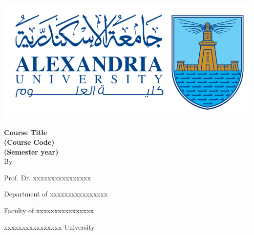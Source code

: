 \newpage
\thispagestyle{empty}
\vspace*{\fill}
\newpage
\thispagestyle{empty}
\setcounter{page}{0}
\begingroup
{}
\begin{center}
    \includegraphics[scale=.5]{collage logo.png}
    \vspace*{1.5cm}
    \par
    {\fontsize{20pt}{30pt}\selectfont
        \textbf{Course Title\\(Course Code)\\(Semester year)}
        \\
        \vspace*{.75cm}
        By
        \vspace*{.75cm}

        Prof. Dr. xxxxxxxxxxxxxxxx

        Department of xxxxxxxxxxxxxxxx

        Faculty of xxxxxxxxxxxxxxxx

        xxxxxxxxxxxxxxxx University
    }
\end{center}
\restoregeometry
\endgroup
\newpage
\tableofcontents
\newpage